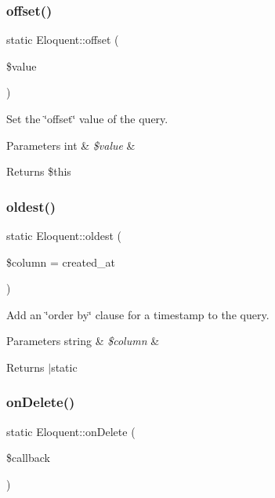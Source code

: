 \subsubsection{\texorpdfstring{offset()}{offset()}}
{\footnotesize\ttfamily static Eloquent\+::offset (\begin{DoxyParamCaption}\item[{}]{\$value }\end{DoxyParamCaption})\hspace{0.3cm}{\ttfamily [static]}}

Set the \char`\"{}offset\char`\"{} value of the query.


\begin{DoxyParams}[1]{Parameters}
int & {\em \$value} & \\
\hline
\end{DoxyParams}
\begin{DoxyReturn}{Returns}
\$this 
\end{DoxyReturn}
\mbox{\label{class_eloquent_a3a6232dc598b629da754e20f19a02a81}} 
\subsubsection{\texorpdfstring{oldest()}{oldest()}}
{\footnotesize\ttfamily static Eloquent\+::oldest (\begin{DoxyParamCaption}\item[{}]{\$column = {\ttfamily \textquotesingle{}created\+\_\+at\textquotesingle{}} }\end{DoxyParamCaption})\hspace{0.3cm}{\ttfamily [static]}}

Add an \char`\"{}order by\char`\"{} clause for a timestamp to the query.


\begin{DoxyParams}[1]{Parameters}
string & {\em \$column} & \\
\hline
\end{DoxyParams}
\begin{DoxyReturn}{Returns}
$\vert$static 
\end{DoxyReturn}
\mbox{\label{class_eloquent_a41dbb3edd9824b60aa6793e8e4f0d5de}} 
\subsubsection{\texorpdfstring{on\+Delete()}{onDelete()}}
{\footnotesize\ttfamily static Eloquent\+::on\+Delete (\begin{DoxyParamCaption}\item[{}]{\$callback }\end{DoxyParamCaption})\hspace{0.3cm}{\ttfamily [static]}}

